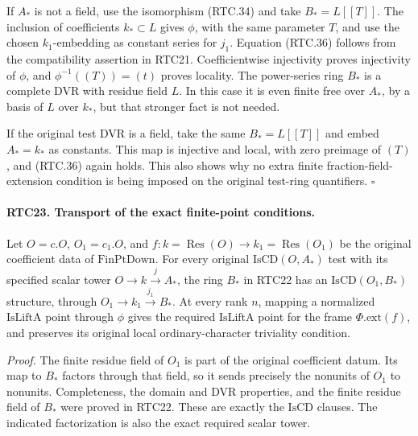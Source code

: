 \documentclass[11pt,a4paper]{article}
\numberwithin{equation}{section}
\theoremstyle{remark}\newtheorem{remark}[theorem]{Remark}
\begin{document}
If \(A_*\) is not a field, use the isomorphism (RTC.34) and
take \(B_*=L[[T]]\).  The inclusion of coefficients
\(k_*\subset L\) gives \(\phi\), with the same parameter
\(T\), and use the chosen \(k_1\)-embedding as constant
series for \(j_1\).  Equation (RTC.36) follows from the
compatibility assertion in RTC21.  Coefficientwise injectivity
proves injectivity of \(\phi\), and
\(\phi^{-1}((T))=(t)\) proves locality.  The power-series
ring \(B_*\) is a complete DVR with residue field \(L\).
In this case it is even finite free over \(A_*\), by a basis
of \(L\) over \(k_*\), but that stronger fact is not needed.

If the original test DVR is a field, take the same
\(B_*=L[[T]]\) and embed \(A_*=k_*\) as constants.
This map is injective and local, with zero preimage of \((T)\),
and (RTC.36) again holds.  This also shows why no extra finite
fraction-field-extension condition is being imposed on the
original test-ring quantifiers. \hfill\(\square\)

\paragraph{RTC23. Transport of the exact finite-point conditions.}
\label{claim:RTC23}
Let \(O=c.O\), \(O_1=c_1.O\), and
\(f:k=\operatorname{Res}(O)\to
 k_1=\operatorname{Res}(O_1)\) be the original coefficient
data of \(\mathrm{FinPtDown}\).  For every original
\(\mathrm{IsCD}(O,A_*)\) test with its specified scalar
tower \(O\to k\xrightarrow{j}A_*\), the ring \(B_*\)
in RTC22 has an \(\mathrm{IsCD}(O_1,B_*)\) structure, through
\(O_1\to k_1\xrightarrow{j_1}B_*\).  At every rank \(n\),
mapping a normalized \(\mathrm{IsLiftA}\) point through
\(\phi\) gives the required \(\mathrm{IsLiftA}\) point for
the frame \(\Phi.\mathrm{ext}(f)\), and preserves its original
local ordinary-character triviality condition.

\emph{Proof.}
The finite residue field of \(O_1\) is part of the original
coefficient datum.  Its map to \(B_*\) factors through that
field, so it sends precisely the nonunits of \(O_1\) to
nonunits.  Completeness, the domain and DVR properties, and the
finite residue field of \(B_*\) were proved in RTC22.  These
are exactly the \(\mathrm{IsCD}\) clauses.  The indicated
factorization is also the exact required scalar tower.
\end{document}
